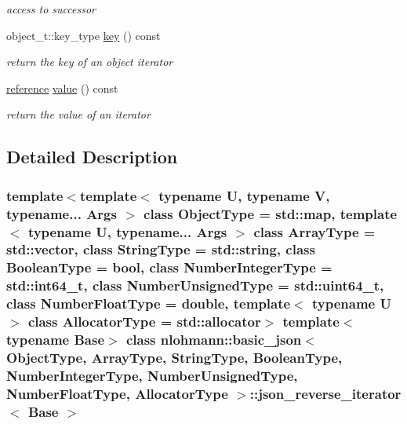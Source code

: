 \begin{DoxyCompactItemize}
\begin{DoxyCompactList}\small\item\em access to successor \end{DoxyCompactList}\item 
\mbox{\label{classnlohmann_1_1basic__json_1_1json__reverse__iterator_a2f5d8a81d607f9222d1ade23f24cc093}} 
object\+\_\+t\+::key\+\_\+type \hyperlink{classnlohmann_1_1basic__json_1_1json__reverse__iterator_a2f5d8a81d607f9222d1ade23f24cc093}{key} () const
\begin{DoxyCompactList}\small\item\em return the key of an object iterator \end{DoxyCompactList}\item 
\mbox{\label{classnlohmann_1_1basic__json_1_1json__reverse__iterator_af1c8b1f3be60159ae0829938a4e674fa}} 
\hyperlink{classnlohmann_1_1basic__json_1_1json__reverse__iterator_a7265535f39299824f9712a2ca15013c3}{reference} \hyperlink{classnlohmann_1_1basic__json_1_1json__reverse__iterator_af1c8b1f3be60159ae0829938a4e674fa}{value} () const
\begin{DoxyCompactList}\small\item\em return the value of an iterator \end{DoxyCompactList}\end{DoxyCompactItemize}


\subsection{Detailed Description}
\subsubsection*{template$<$template$<$ typename U, typename V, typename... Args $>$ class Object\+Type = std\+::map, template$<$ typename U, typename... Args $>$ class Array\+Type = std\+::vector, class String\+Type = std\+::string, class Boolean\+Type = bool, class Number\+Integer\+Type = std\+::int64\+\_\+t, class Number\+Unsigned\+Type = std\+::uint64\+\_\+t, class Number\+Float\+Type = double, template$<$ typename U $>$ class Allocator\+Type = std\+::allocator$>$\newline
template$<$typename Base$>$\newline
class nlohmann\+::basic\+\_\+json$<$ Object\+Type, Array\+Type, String\+Type, Boolean\+Type, Number\+Integer\+Type, Number\+Unsigned\+Type, Number\+Float\+Type, Allocator\+Type $>$\+::json\+\_\+reverse\+\_\+iterator$<$ Base $>$}

